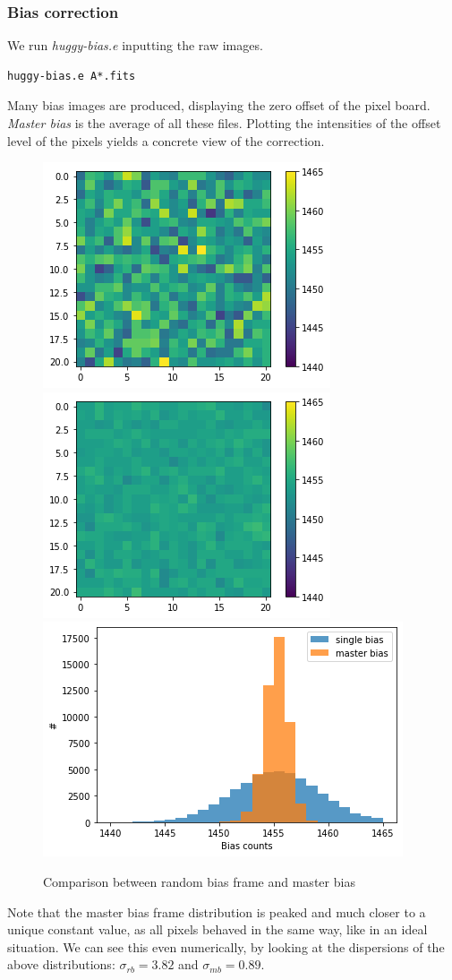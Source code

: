 \documentclass[a4paper,11pt,twocolumn]{article}
\begin{document}
\subsubsection{Bias correction}
We run \textit{huggy-bias.e} inputting the raw images. 
\begin{lstlisting}
huggy-bias.e A*.fits
\end{lstlisting}
Many bias images are produced,
displaying the zero offset of the pixel board. \textit{Master bias} is the average 
of all these files. Plotting the intensities of the offset level of the pixels yields 
a concrete view of the correction.
\begin{figure}[H]
    \centering  
    \includegraphics[scale=0.32, angle=0]{../pictures/pre-reduction/bias.png}
    \includegraphics[scale=0.32, angle=0]{../pictures/pre-reduction/master_bias.png}
    \includegraphics[scale=0.35, angle=0]{../pictures/pre-reduction/bias_comp.png}
    \caption{Comparison between random bias frame and master bias}
\end{figure}
Note that the master bias frame distribution is peaked and much closer to a 
unique constant value, as all pixels behaved in the same way, like in an 
ideal situation. We can see this even numerically, by looking at the 
dispersions of the above distributions: $\sigma_{rb} = 3.82$ and 
$\sigma_{mb} = 0.89$.
\end{document}
